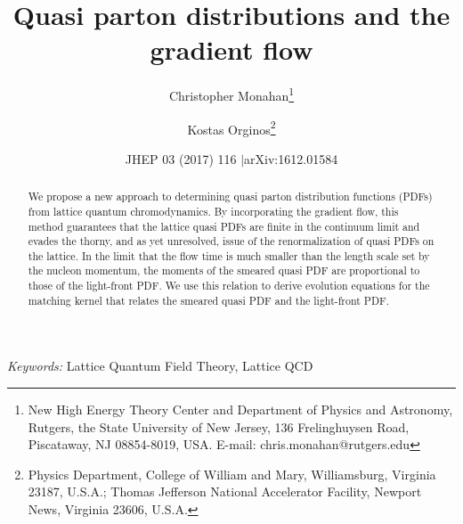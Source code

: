 \documentclass[11pt]{article}
\title{Quasi parton distributions and the gradient flow}
\author{Christopher Monahan\thanks{New High Energy Theory Center and Department of Physics and
Astronomy, Rutgers, the State University of New Jersey,
136 Frelinghuysen Road, Piscataway, NJ 08854-8019, USA.
E-mail: chris.monahan@rutgers.edu}}
\author{Kostas Orginos\thanks{Physics Department, College of William and Mary,
Williamsburg, Virginia 23187, U.S.A.; Thomas Jefferson National Accelerator Facility,
Newport News, Virginia 23606, U.S.A.}}
\date{JHEP 03 (2017) 116 \quad$\vert$\quad arXiv:1612.01584}
\begin{document}
\maketitle

\begin{abstract}
We propose a new approach to
determining quasi parton distribution functions (PDFs) from lattice quantum
chromodynamics.
By incorporating the gradient flow, this method guarantees that the lattice
quasi PDFs are finite in the continuum
limit and evades the thorny, and as yet
unresolved, issue of the renormalization of quasi PDFs on the lattice. In the
limit that the
flow time is much smaller than the length scale set by the nucleon momentum,
the moments of the smeared quasi PDF are
proportional to those of the light-front PDF.
We use this
relation to derive evolution equations for the matching kernel that relates the
smeared quasi PDF and the light-front PDF.
\end{abstract}

\noindent\textit{Keywords:} Lattice Quantum Field Theory, Lattice QCD







\end{document}
